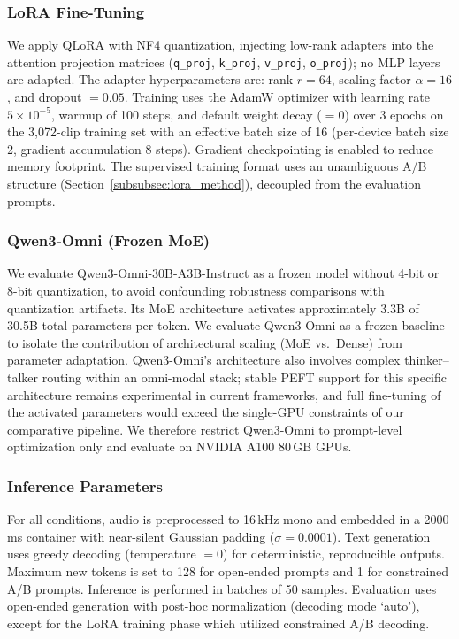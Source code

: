 \documentclass[11pt,a4paper]{article}
\begin{document}
\subsubsection{LoRA Fine-Tuning}
\label{subsubsec:lora_config}

We apply QLoRA with NF4 quantization, injecting low-rank adapters into the attention projection matrices (\texttt{q\_proj}, \texttt{k\_proj}, \texttt{v\_proj}, \texttt{o\_proj}); no MLP layers are adapted. The adapter hyperparameters are: rank $r = 64$, scaling factor $\alpha = 16$, and dropout $= 0.05$. Training uses the AdamW optimizer with learning rate $5 \times 10^{-5}$, warmup of 100 steps, and default weight decay ($= 0$) over 3 epochs on the 3{,}072-clip training set with an effective batch size of 16 (per-device batch size 2, gradient accumulation 8 steps). Gradient checkpointing is enabled to reduce memory footprint. The supervised training format uses an unambiguous A/B structure (Section~\ref{subsubsec:lora_method}), decoupled from the evaluation prompts.

\subsubsection{Qwen3-Omni (Frozen MoE)}
\label{subsubsec:qwen3_config}

We evaluate Qwen3-Omni-30B-A3B-Instruct as a frozen model without 4-bit or 8-bit quantization, to avoid confounding robustness comparisons with quantization artifacts. Its MoE architecture activates approximately 3.3B of 30.5B total parameters per token. We evaluate Qwen3-Omni as a frozen baseline to isolate the contribution of architectural scaling (MoE vs.\ Dense) from parameter adaptation. Qwen3-Omni's architecture also involves complex thinker--talker routing within an omni-modal stack; stable PEFT support for this specific architecture remains experimental in current frameworks, and full fine-tuning of the activated parameters would exceed the single-GPU constraints of our comparative pipeline. We therefore restrict Qwen3-Omni to prompt-level optimization only and evaluate on NVIDIA A100 80\,GB GPUs.

\subsubsection{Inference Parameters}
\label{subsubsec:inference}

For all conditions, audio is preprocessed to 16\,kHz mono and embedded in a 2000\,ms container with near-silent Gaussian padding ($\sigma = 0.0001$). Text generation uses greedy decoding (temperature $= 0$) for deterministic, reproducible outputs. Maximum new tokens is set to 128 for open-ended prompts and 1 for constrained A/B prompts. Inference is performed in batches of 50 samples. Evaluation uses open-ended generation with post-hoc normalization (decoding mode `auto'), except for the LoRA training phase which utilized constrained A/B decoding.
\end{document}
